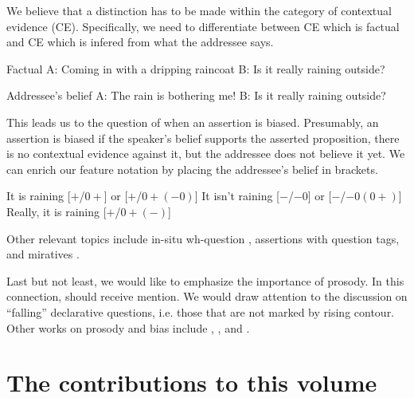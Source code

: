\documentclass[output=paper,colorlinks,citecolor=brown]{langscibook}
\begin{document}
We believe that a distinction has to be made within the category of contextual evidence (CE). Specifically, we need to differentiate between CE which is factual and CE which is infered from what the addressee says. %

\ea Factual
\ea A: Coming in with a dripping raincoat
\ex B: Is it really raining outside?
\z
\z

\ea Addressee's belief
\ea A: The rain is bothering me!
\ex B: Is it really raining outside?
\z
\z

This leads us to the question of when an assertion is biased. Presumably, an assertion is biased if the speaker's belief supports the asserted proposition, there is no contextual evidence against it, but the addressee does not believe it yet. We can enrich our feature notation by placing the addressee's belief in brackets.

\ea
It is raining \hfill [$+$/$0+$] or [$+$/$0+(-0)$]
\ex
It isn't raining \hfill [$-$/$-0$] or [$-$/$-0(0+)$]
\ex
Really, it is raining \hfill [$+$/$0+(-)$]
\z

Other relevant topics include in-situ wh-question \citep{biezma2019alternative}, assertions with question tags, and miratives \citep{delancey1997mirativity, bustamente2012real}. 

Last but not least, we would like to emphasize the importance of prosody. In this connection, \citet{Bartels:1999} should receive mention. We would draw attention to the discussion on ``falling'' declarative questions, i.e. those that are not marked by rising contour. Other works on prosody and bias include \citet{gricesavino2003map}, \citet{kugler2004dialectal}, and \citet{arnhold2021}. 

\section{The contributions to this volume}
\end{document}
